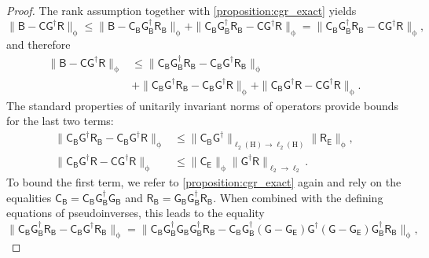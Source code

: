 \documentclass[onefignum,onetabnum]{siamart250211}
\renewenvironment{equation*}{\[}{\]\ignorespacesafterend}
\newcommand{\Hilb}{\mathrm{H}}
\newcommand{\Batrix}[1]{\bm{\Matrix{#1}}}
\newcommand{\Matrix}[1]{\mathsf{#1}}
\newcommand{\pinv}{\dagger}
\newcommand{\Norm}[3][]{#1\| #2 #1\|_{\mathrm{#3}}}
\begin{document}
\begin{proof}
The rank assumption together with \cref{proposition:cgr_exact} yields
\begin{equation*}
    \Norm{\Batrix{B} - \Batrix{C} \Batrix{G}^\pinv \Batrix{R}}{\phi} \leq \Norm{\Batrix{B} - \Batrix{C}_{\Batrix{B}} \Batrix{G}_{\Batrix{B}}^\pinv \Batrix{R}_{\Batrix{B}}}{\phi} + \Norm{\Batrix{C}_{\Batrix{B}} \Batrix{G}_{\Batrix{B}}^\pinv \Batrix{R}_{\Batrix{B}} - \Batrix{C} \Batrix{G}^\pinv \Batrix{R}}{\phi} = \Norm{\Batrix{C}_{\Batrix{B}} \Batrix{G}_{\Batrix{B}}^\pinv \Batrix{R}_{\Batrix{B}} - \Batrix{C} \Batrix{G}^\pinv \Batrix{R}}{\phi},
\end{equation*}
and therefore
\begin{align*}
    \Norm{\Batrix{B} - \Batrix{C} \Batrix{G}^\pinv \Batrix{R}}{\phi} &\leq \Norm{\Batrix{C}_{\Batrix{B}} \Batrix{G}_{\Batrix{B}}^\pinv \Batrix{R}_{\Batrix{B}} - \Batrix{C}_{\Batrix{B}} \Batrix{G}^\pinv \Batrix{R}_{\Batrix{B}}}{\phi} \\
    &+ \Norm{\Batrix{C}_{\Batrix{B}} \Batrix{G}^\pinv \Batrix{R}_{\Batrix{B}} - \Batrix{C}_{\Batrix{B}} \Batrix{G}^\pinv \Batrix{R}}{\phi} + \Norm{\Batrix{C}_{\Batrix{B}} \Batrix{G}^\pinv \Batrix{R} - \Batrix{C} \Batrix{G}^\pinv \Batrix{R}}{\phi}.
\end{align*}
The standard properties of unitarily invariant norms of operators \cite[\S~3.3]{gohberg1969introduction} provide bounds for the last two terms:
\begin{align*}
    \Norm{\Batrix{C}_{\Batrix{B}} \Batrix{G}^\pinv \Batrix{R}_{\Batrix{B}} - \Batrix{C}_{\Batrix{B}} \Batrix{G}^\pinv \Batrix{R}}{\phi} &\leq \Norm{\Batrix{C}_{\Batrix{B}} \Batrix{G}^\pinv}{\ell_2(\Hilb) \to \ell_2(\Hilb)} \Norm{\Batrix{R}_{\Batrix{E}}}{\phi}, \\
    \Norm{\Batrix{C}_{\Batrix{B}} \Batrix{G}^\pinv \Batrix{R} - \Batrix{C} \Batrix{G}^\pinv \Batrix{R}}{\phi} &\leq \Norm{\Batrix{C}_{\Batrix{E}}}{\phi} \Norm{\Batrix{G}^\pinv \Batrix{R}}{\ell_2 \to \ell_2}.
\end{align*}
To bound the first term, we refer to \cref{proposition:cgr_exact} again and rely on the equalities $\Batrix{C}_{\Batrix{B}} = \Batrix{C}_{\Batrix{B}} \Batrix{G}_{\Batrix{B}}^\pinv \Batrix{G}_{\Batrix{B}}$ and $\Batrix{R}_{\Batrix{B}} = \Batrix{G}_{\Batrix{B}} \Batrix{G}_{\Batrix{B}}^\pinv \Batrix{R}_{\Batrix{B}}$.
When combined with the defining equations of pseudoinverses, this leads to the equality
\begin{equation}
\label{eq:cgr_error_part}
    \Norm{\Batrix{C}_{\Batrix{B}} \Batrix{G}_{\Batrix{B}}^\pinv \Batrix{R}_{\Batrix{B}} - \Batrix{C}_{\Batrix{B}} \Batrix{G}^\pinv \Batrix{R}_{\Batrix{B}}}{\phi} = \Norm{\Batrix{C}_{\Batrix{B}} \Batrix{G}_{\Batrix{B}}^\pinv \Batrix{G}_{\Batrix{B}} \Batrix{G}_{\Batrix{B}}^\pinv \Batrix{R}_{\Batrix{B}} - \Batrix{C}_{\Batrix{B}} \Batrix{G}_{\Batrix{B}}^\pinv (\Batrix{G} - \Batrix{G}_{\Batrix{E}}) \Batrix{G}^\pinv (\Batrix{G} - \Batrix{G}_{\Batrix{E}}) \Batrix{G}_{\Batrix{B}}^\pinv \Batrix{R}_{\Batrix{B}}}{\phi},

\end{equation}
\end{proof}
\end{document}
